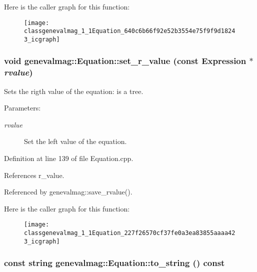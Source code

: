 Here is the caller graph for this function:\nopagebreak
\begin{figure}[H]
\begin{center}
\leavevmode
\texttt{[image: classgenevalmag\_1\_1Equation\_640c6b66f92e52b3554e75f9f9d18243\_icgraph]}
\end{center}
\end{figure}
\hypertarget{classgenevalmag_1_1Equation_227f26570cf37fe0a3ea83855aaaa423}{
\subsubsection[{set\_\-r\_\-value}]{\setlength{\rightskip}{0pt plus 5cm}void genevalmag::Equation::set\_\-r\_\-value (const {\bf Expression} $\ast$ {\em rvalue})}}
\label{classgenevalmag_1_1Equation_227f26570cf37fe0a3ea83855aaaa423}


Sets the rigth value of the equation: is a tree. \begin{Desc}
\item[Parameters:]
\begin{description}
\item[{\em rvalue}]Set the left value of the equation. \end{description}
\end{Desc}


Definition at line 139 of file Equation.cpp.

References r\_\-value.

Referenced by genevalmag::save\_\-rvalue().

Here is the caller graph for this function:\nopagebreak
\begin{figure}[H]
\begin{center}
\leavevmode
\texttt{[image: classgenevalmag\_1\_1Equation\_227f26570cf37fe0a3ea83855aaaa423\_icgraph]}
\end{center}
\end{figure}
\hypertarget{classgenevalmag_1_1Equation_1daad7e8abb06ec02999ce3e9fc38322}{
\subsubsection[{to\_\-string}]{\setlength{\rightskip}{0pt plus 5cm}const string genevalmag::Equation::to\_\-string () const}}
\label{classgenevalmag_1_1Equation_1daad7e8abb06ec02999ce3e9fc38322}


